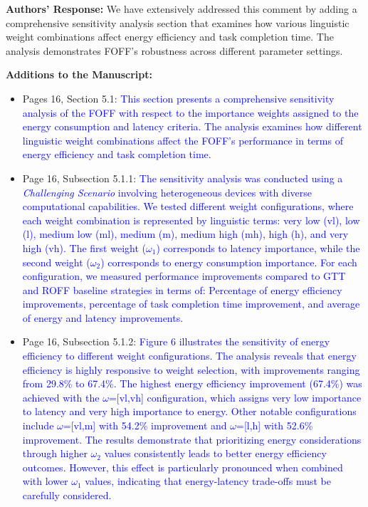 \textbf{Authors' Response:} 
We have extensively addressed this comment by adding a comprehensive sensitivity analysis section that examines how various linguistic weight combinations affect energy efficiency and task completion time. The analysis demonstrates FOFF's robustness across different parameter settings.

\textbf{Additions to the Manuscript:} 

\begin{itemize}
    \item Pages 16, Section 5.1: \textcolor{blue}{This section presents a comprehensive sensitivity analysis of the FOFF with respect to the importance weights assigned to the energy consumption and latency criteria. The analysis examines how different linguistic weight combinations affect the FOFF's performance in terms of energy efficiency and task completion time.}
    \item Page 16, Subsection 5.1.1: \textcolor{blue}{The sensitivity analysis was conducted using a \textit{Challenging Scenario} involving heterogeneous devices with diverse computational capabilities. We tested different weight configurations, where each weight combination is represented by linguistic terms: very low (vl), low (l), medium low (ml), medium (m), medium high (mh), high (h), and very high (vh). The first weight ($\omega_1$) corresponds to latency importance, while the second weight ($\omega_2$) corresponds to energy consumption importance. For each configuration, we measured performance improvements compared to GTT and ROFF baseline strategies in terms of: Percentage of energy efficiency improvements, percentage of task completion time improvement, and average of energy and latency improvements.}
    \item Page 16, Subsection 5.1.2: \textcolor{blue}{Figure 6 illustrates the sensitivity of energy efficiency to different weight configurations. The analysis reveals that energy efficiency is highly responsive to weight selection, with improvements ranging from 29.8\% to 67.4\%. The highest energy efficiency improvement (67.4\%) was achieved with the $\omega$=[vl,vh] configuration, which assigns very low importance to latency and very high importance to energy. Other notable configurations include $\omega$=[vl,m] with 54.2\% improvement and $\omega$=[l,h] with 52.6\% improvement. The results demonstrate that prioritizing energy considerations through higher $\omega_2$ values consistently leads to better energy efficiency outcomes. However, this effect is particularly pronounced when combined with lower $\omega_1$ values, indicating that energy-latency trade-offs must be carefully considered.}

\end{itemize}
